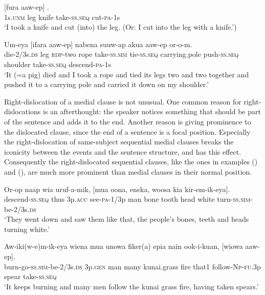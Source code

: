 \ea%
\label{ex:x1467}
\gll {}    [fura  aaw-ep]  . \\
1s.\textsc{unm} leg  knife  take-\textsc{ss}.\textsc{seq} cut-\textsc{pa}-1s\\
\glt`I took a knife and cut (into) the leg. (Or: I cut into the leg with a knife.')
\z


\ea%
\label{ex:x1468}
\gll Um-eya      [ifara  aaw-ep]   nabena  suuw-ap  akua  aaw-ep  or-o-m.\\
die-2/3s.\textsc{ds} leg \textsc{rdp}-two rope take-\textsc{ss}.\textsc{sim} tie-\textsc{ss}.\textsc{seq} carrying.pole push-\textsc{ss}.\textsc{seq} shoulder take-\textsc{ss}.\textsc{seq} descend-\textsc{pa}-1s\\
\glt`It (=a pig) died and I took a rope and tied its legs two and two together and pushed it to a carrying pole and carried it down on my shoulder.'
\z


Right-dislocation of a medial clause is not unusual. One common reason for right-dislocations is an afterthought: the speaker notices something that should be part of the sentence and adds it to the end. Another reason is giving prominence to the dislocated clause, since the end of a sentence is a focal position. Especially the right-dislocation of same-subject sequential medial clauses breaks the iconicity between the events and the sentence structure, and has this effect. Consequently the right-dislocated  sequential clauses, like the ones in examples () and (), are much more prominent than medial clauses in their normal position.

\ea%
\label{ex:x1471}
\gll Or-op  naap  wia  uruf-a-mik,  [mua  oona,  eneka,  woosa kia  kir-em-ik-eya]. \\
descend-\textsc{ss}.\textsc{seq} thus 3p.\textsc{acc} see-\textsc{pa}-1/3p man  bone  tooth  head white  turn-\textsc{ss}.\textsc{sim}-be-2/3s.\textsc{ds}\\
\glt`They went down and saw them like that, the people's bones, teeth and heads turning white.'
\z


\ea%
\label{ex:x1469}
\gll Aw-iki(w-e)m-ik-eya  wiena  mua  unowa  fiker(a)  epia nain  ook-i-kuan,  [wiowa  aaw-ep].\\
burn-go-\textsc{ss}.\textsc{sim}-be-2/3s.\textsc{ds} 3p.\textsc{gen} man  many  kunai.grass  fire that1 follow-\textsc{Np}-\textsc{fu}.3p  spear  take-\textsc{ss}.\textsc{seq}\\
\glt`It keeps burning and many men follow the kunai grass fire, having taken spears.'
\z


